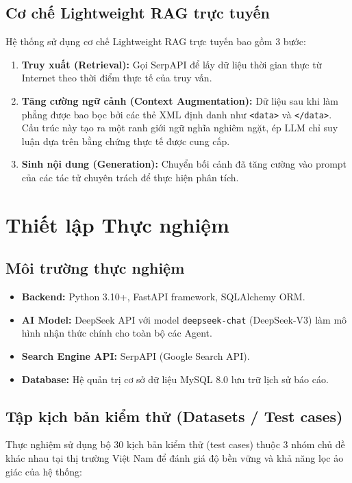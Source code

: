\documentclass[11pt,a4paper]{article}
\begin{document}
\begin{itemize}
\subsection{Cơ chế Lightweight RAG trực tuyến}
Hệ thống sử dụng cơ chế Lightweight RAG trực tuyến bao gồm 3 bước:
\begin{enumerate}
    \item \textbf{Truy xuất (Retrieval):} Gọi SerpAPI để lấy dữ liệu thời gian thực từ Internet theo thời điểm thực tế của truy vấn.
    \item \textbf{Tăng cường ngữ cảnh (Context Augmentation):} Dữ liệu sau khi làm phẳng được bao bọc bởi các thẻ XML định danh như \texttt{<data>} và \texttt{</data>}. Cấu trúc này tạo ra một ranh giới ngữ nghĩa nghiêm ngặt, ép LLM chỉ suy luận dựa trên bằng chứng thực tế được cung cấp.
    \item \textbf{Sinh nội dung (Generation):} Chuyển bối cảnh đã tăng cường vào prompt của các tác tử chuyên trách để thực hiện phân tích.
\end{enumerate}



\section{Thiết lập Thực nghiệm}

\subsection{Môi trường thực nghiệm}
\begin{itemize}
    \item \textbf{Backend:} Python 3.10+, FastAPI framework, SQLAlchemy ORM.
    \item \textbf{AI Model:} DeepSeek API với model \texttt{deepseek-chat} (DeepSeek-V3) làm mô hình nhận thức chính cho toàn bộ các Agent.
    \item \textbf{Search Engine API:} SerpAPI (Google Search API).
    \item \textbf{Database:} Hệ quản trị cơ sở dữ liệu MySQL 8.0 lưu trữ lịch sử báo cáo.
\end{itemize}

\subsection{Tập kịch bản kiểm thử (Datasets / Test cases)}
Thực nghiệm sử dụng bộ 30 kịch bản kiểm thử (test cases) thuộc 3 nhóm chủ đề khác nhau tại thị trường Việt Nam để đánh giá độ bền vững và khả năng lọc ảo giác của hệ thống:


\end{itemize}
\end{document}
